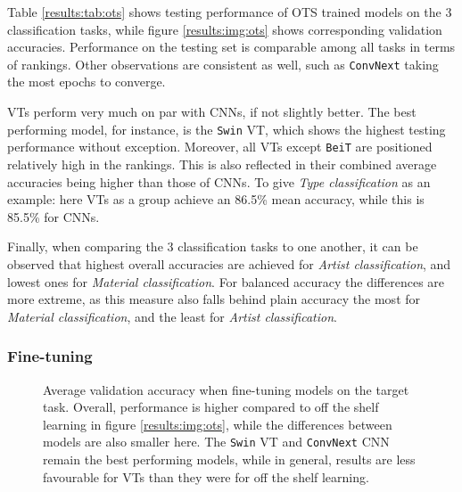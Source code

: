 Table \ref{results:tab:ots} shows testing performance of OTS trained models on the 3 classification tasks, while figure \ref{results:img:ots} shows corresponding validation accuracies. Performance on the testing set is comparable among all tasks in terms of rankings. Other observations are consistent as well, such as \texttt{ConvNext} taking the most epochs to converge.

VTs perform very much on par with CNNs, if not slightly better. The best performing model, for instance, is the \texttt{Swin} VT, which shows the highest testing performance without exception. Moreover, all VTs except \texttt{BeiT} are positioned relatively high in the rankings. This is also reflected in their combined average accuracies being higher than those of CNNs. To give \textit{Type classification} as an example: here VTs as a group achieve an 86.5\% mean accuracy, while this is 85.5\% for CNNs.

Finally, when comparing the 3 classification tasks to one another, it can be observed that highest overall accuracies are achieved for \textit{Artist classification}, and lowest ones for \textit{Material classification}. For balanced accuracy the differences are more extreme, as this measure also falls behind plain accuracy the most for \textit{Material classification}, and the least for \textit{Artist classification}.



\subsubsection{Fine-tuning} \label{results:ft}

\begin{figure}[tb]
    \centering
    \def\svgwidth{\textwidth}
    
    \caption{Average validation accuracy when fine-tuning models on the target task. Overall, performance is higher compared to off the shelf learning in figure \ref{results:img:ots}, while the differences between models are also smaller here. The \texttt{Swin} VT and \texttt{ConvNext} CNN remain the best performing models, while in general, results are less favourable for VTs than they were for off the shelf learning.}
    \label{results:img:ft}
\end{figure}

